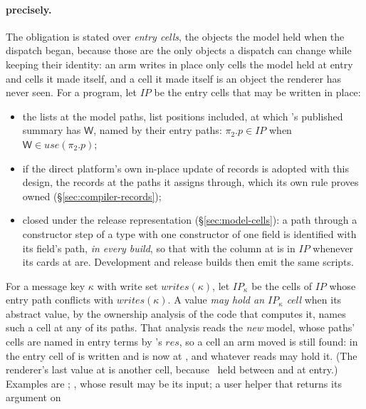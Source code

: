 \paragraph{ precisely.} The obligation is stated over \emph{entry cells}, the objects the model held
when the dispatch began, because those are the only objects a dispatch can change while keeping their
identity: an arm writes in place only cells the model held at entry and cells it made itself, and a cell
it made itself is an object the renderer has never seen. For a program, let $\mathit{IP}$ be the entry
cells that may be written in place:
\begin{itemize}
\item the lists at the model paths, list positions included, at which 's published summary
has $\mathsf{W}$, named by their entry paths: $\pi_2.p \in \mathit{IP}$ when $\mathsf{W} \in
\mathit{use}(\pi_2.p)$;
\item if the direct platform's own in-place update of records is adopted with this design, the records at
the paths it assigns through, which its own rule proves owned (\S\ref{sec:compiler-records});
\item closed under the release representation (\S\ref{sec:model-cells}): a path through a constructor step
of a type with one constructor of one field is identified with its field's path, \emph{in every build}, so
that with  the column at  is in $\mathit{IP}$ whenever
its cards at  are. Development and release builds then emit the same scripts.
\end{itemize}
For a message key $\kappa$ with write set $\mathit{writes}(\kappa)$, let $\mathit{IP}_\kappa$ be the cells
of $\mathit{IP}$ whose entry path conflicts with $\mathit{writes}(\kappa)$. A value \emph{may hold an
$\mathit{IP}_\kappa$ cell} when its abstract value, by the ownership analysis of the code that computes it,
names such a cell at any of its paths. That analysis reads the \emph{new} model, whose paths' cells are
named in entry terms by 's $\mathit{res}$, so a cell an arm moved is still found: in
 the entry cell of  is written and is now at
, and whatever reads  may hold it. (The renderer's last value at  is another cell,
because \Disjoint\ held between  and  at entry.) Examples are ;
, whose result may be its input; a user helper that returns its argument on
